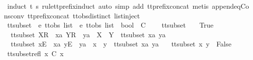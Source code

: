 \begin{isabellebody}
\isamarkupfalse%
\ {\isacharparenleft}induct\ t{}\ s{}\ rule{\isacharcolon}tt{\isacharunderscore}prefix{\isachardot}induct{\isacharcomma}\ auto\ simp\ add{\isacharcolon}\ tt{\isacharunderscore}prefix{\isacharunderscore}concat{\isacharcomma}\ metis\ append{\isacharunderscore}eq{\isacharunderscore}Cons{\isacharunderscore}conv\ tt{\isacharunderscore}prefix{\isacharunderscore}concat\ ttobs{\isachardot}distinct{\isacharparenleft}{}{\isacharparenright}\ list{\isachardot}inject{\isacharparenright}%
\endisatagproof
{\isafoldproof}%
%
\isadelimproof
%
\endisadelimproof
%
\isadelimdocument
%
\endisadelimdocument
%
\isatagdocument
%
\isamarkuptrue%
%
\endisatagdocument
{\isafolddocument}%
%
\isadelimdocument
%
\endisadelimdocument
{}\isamarkupfalse%
\ tt{\isacharunderscore}subset\ {\isacharcolon}{\isacharcolon}\ {\isachardoublequoteopen}{\isacharprime}e\ ttobs\ list\ {\isasymRightarrow}\ {\isacharprime}e\ ttobs\ list\ {\isasymRightarrow}\ bool{\isachardoublequoteclose}\ {\isacharparenleft}\ {\isachardoublequoteopen}{\isasymsubseteq}\isactrlsub C{\isachardoublequoteclose}\ {}{}{\isacharparenright}\ \isanewline
\ \ {\isachardoublequoteopen}tt{\isacharunderscore}subset\ {\isacharbrackleft}{\isacharbrackright}\ {\isacharbrackleft}{\isacharbrackright}\ {\isacharequal}\ True{\isachardoublequoteclose}\ {\isacharbar}\isanewline
\ \ {\isachardoublequoteopen}tt{\isacharunderscore}subset\ {\isacharparenleft}{\isacharbrackleft}X{\isacharbrackright}\isactrlsub R\ {\isacharhash}\ xa{\isacharparenright}\ {\isacharparenleft}{\isacharbrackleft}Y{\isacharbrackright}\isactrlsub R\ {\isacharhash}\ ya{\isacharparenright}\ {\isacharequal}\ {\isacharparenleft}X\ {\isasymsubseteq}\ Y\ {\isasymand}\ tt{\isacharunderscore}subset\ xa\ ya{\isacharparenright}{\isachardoublequoteclose}\ {\isacharbar}\isanewline
\ \ {\isachardoublequoteopen}tt{\isacharunderscore}subset\ {\isacharparenleft}{\isacharbrackleft}x{\isacharbrackright}\isactrlsub E\ {\isacharhash}\ xa{\isacharparenright}\ {\isacharparenleft}{\isacharbrackleft}y{\isacharbrackright}\isactrlsub E\ {\isacharhash}\ ya{\isacharparenright}\ {\isacharequal}\ {\isacharparenleft}x\ {\isacharequal}\ y\ {\isasymand}\ tt{\isacharunderscore}subset\ xa\ ya{\isacharparenright}{\isachardoublequoteclose}\ {\isacharbar}\isanewline
\ \ {\isachardoublequoteopen}tt{\isacharunderscore}subset\ x\ y\ {\isacharequal}\ False{\isachardoublequoteclose}\isanewline
\isanewline
{}\isamarkupfalse%
\ tt{\isacharunderscore}subset{\isacharunderscore}refl{\isacharcolon}\ {\isachardoublequoteopen}x\ {\isasymsubseteq}\isactrlsub C\ x{\isachardoublequoteclose}\isanewline

\end{isabellebody}

